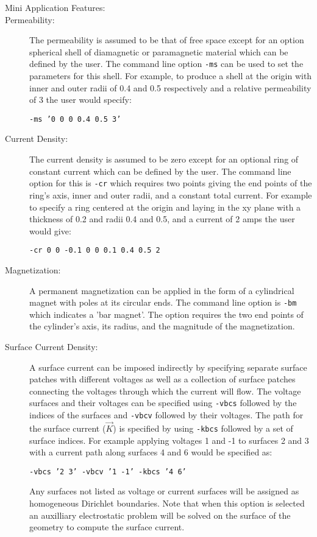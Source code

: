 \documentclass{article}
\begin{document}
\begin{description}
\item[Mini Application Features:]
\item[Permeability:] The permeability is assumed to be that of free
  space except for an option spherical shell of diamagnetic or
  paramagnetic material which can be defined by the user.  The command
  line option {\tt -ms} can be used to set the parameters for this
  shell.  For example, to produce a shell at the origin with inner and
  outer radii of 0.4 and 0.5 respectively and a relative permeability
  of 3 the user would specify:
  \begin{center}{\tt -ms '0 0 0 0.4 0.5 3'}\end{center}

\item[Current Density:] The current density is assumed to be zero
  except for an optional ring of constant current which can be defined
  by the user.  The command line option for this is {\tt -cr} which
  requires two points giving the end points of the ring's axis, inner
  and outer radii, and a constant total current.  For example to
  specify a ring centered at the origin and laying in the xy plane
  with a thickness of 0.2 and radii 0.4 and 0.5, and a current of 2
  amps the user would give:
  \begin{center}{\tt -cr 0 0 -0.1 0 0 0.1 0.4 0.5 2}\end{center}

\item[Magnetization:] A permanent magnetization can be applied in the
  form of a cylindrical magnet with poles at its circular ends.  The
  command line option is {\tt -bm} which indicates a 'bar magnet'.
  The option requires the two end points of the cylinder's axis, its
  radius, and the magnitude of the magnetization.

\item[Surface Current Density:] A surface current can be imposed
  indirectly by specifying separate surface patches with different
  voltages as well as a collection of surface patches connecting the
  voltages through which the current will flow.  The voltage surfaces
  and their voltages can be specified using {\tt -vbcs} followed by
  the indices of the surfaces and {\tt -vbcv} followed by their
  voltages.  The path for the surface current ($\vec{K}$) is specified
  by using {\tt -kbcs} followed by a set of surface indices.  For
  example applying voltages 1 and -1 to surfaces 2 and 3 with a
  current path along surfaces 4 and 6 would be specified as:
  \begin{center}{\tt -vbcs '2 3' -vbcv '1 -1' -kbcs '4 6'}\end{center}
  Any surfaces not listed as voltage or current surfaces will be
  assigned as homogeneous Dirichlet boundaries.  Note that when this
  option is selected an auxilliary electrostatic problem will be
  solved on the surface of the geometry to compute the surface
  current.


\end{description}
\end{document}

